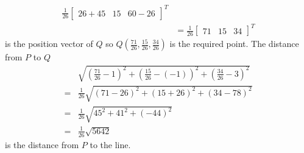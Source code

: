 \documentclass[../main.tex]{subfiles}
\begin{document}
\begin{enumerate}[a)]
\begin{align*}
			\frac{1}{26}\begin{bmatrix}26+45&15&60-26\end{bmatrix}^T
			\\&=
			\frac{1}{26}\begin{bmatrix}71&15&34\end{bmatrix}^T
		\end{align*}
		is the position vector of $Q$ so $Q(\frac{71}{26}, \frac{15}{26}, \frac{34}{26})$ is the required point.
		The distance from $P$ to $Q$
		\begin{align*}
			&
			\sqrt{
				\left(\frac{71}{26} - 1\right)^2
				+
				\left(\frac{15}{26} - (-1)\right)^2
				+
				\left(\frac{34}{26} - 3\right)^2
			}
			\\=&
			\frac{1}{26}
			\sqrt{
				\left(71 - 26\right)^2
				+
				\left(15 + 26\right)^2
				+
				\left(34 - 78\right)^2
			}
			\\=&
			\frac{1}{26}
			\sqrt{45^2 + 41^2 + (-44)^2}
			\\=&
			\frac{1}{26}
			\sqrt{5642}
		\end{align*}
		is the distance from $P$ to the line.
\end{enumerate}
\end{document}
